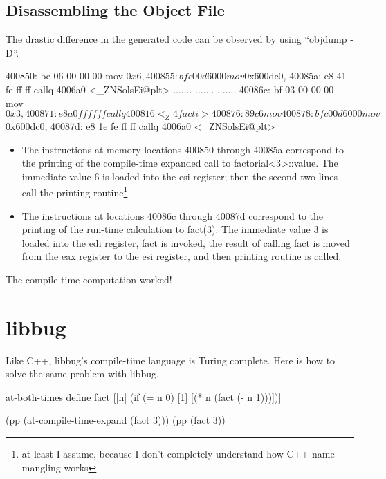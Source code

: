  \subsection{Disassembling the Object File}
 The drastic difference in the generated code can be observed by using ``objdump -D''.

 \begin{code}
 400850: be 06 00 00 00   mov    $0x6,%
 400855: bf c0 0d 60 00   mov    $0x600dc0,%
 40085a: e8 41 fe ff ff   callq  4006a0 <_ZNSolsEi@plt>
 .......
 .......
 .......
 40086c: bf 03 00 00 00   mov    $0x3,%
 400871: e8 a0 ff ff ff   callq  400816 <_Z4facti>
 400876: 89 c6            mov    %
 400878: bf c0 0d 60 00   mov    $0x600dc0,%
 40087d: e8 1e fe ff ff   callq  4006a0 <_ZNSolsEi@plt>
 \end{code}

 \begin{itemize}
   \item
 The instructions at memory locations 400850 through 40085a correspond to the
 printing of the compile-time expanded call to factorial\textless3\textgreater::value.
 The immediate value 6 is loaded into the esi register; then the second
 two lines call the printing routine\footnote{at least I assume, because
 I don't completely understand how C++ name-mangling works}.
   \item
 The instructions at locations 40086c through 40087d correspond to the
 printing of the run-time calculation to fact(3).  The immediate value 3
 is loaded into the edi register, fact is invoked, the result of
 calling fact is moved from the eax register to the esi register, and then
 printing routine is called.

 \end{itemize}
 The compile-time computation worked!

 \section{libbug}
 Like C++, libbug's compile-time language is Turing complete.
 Here is how to solve the same problem with libbug.

 \begin{code}
 {at-both-times
  {define fact
    [|n| (if (= n 0)
             [1]
             [(* n (fact (- n 1)))])]}}

 (pp (at-compile-time-expand (fact 3)))
 (pp (fact 3))
 \end{code}

